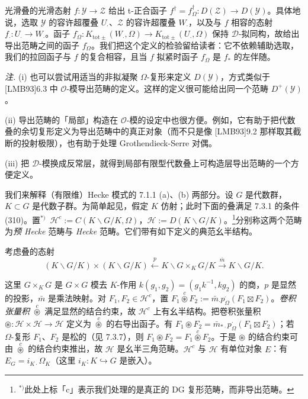 光滑叠的光滑态射 $f:\mathcal{Y}\to\mathcal{Z}$ 给出 t-正合函子 $f^{\dagger}=f^{\dagger}_{\Omega}:D(\mathcal{Z})\to D(\mathcal{Y})$。具体地说，选取 $\mathcal{Y}$ 的容许超覆叠 $U_{\cdot}$、$\mathcal{Z}$ 的容许超覆叠 $W_{\cdot}$，以及与 $f$ 相容的态射 $f_{\cdot}:U_{\cdot}\to W_{\cdot}$。函子 $f^{\cdot}_{\Omega}:K_{\mathrm{tot}\pm}(W_{\cdot},\Omega)\to K_{\mathrm{tot}\pm}(U_{\cdot},\Omega)$ 保持 $\mathcal{D}$-拟同构，故给出导出范畴之间的函子 $f^{\cdot}_{\Omega}$。我们把这个定义的检验留给读者：它不依赖辅助选取，我们的拉回函子与 $f$ 的复合相容，且当 $f$ 拟紧时函子 $f^{\cdot}_{\Omega}$ 是 $f_{*}$ 的左伴随。



 \emph{注.} (i) 也可以尝试用适当的非拟凝聚 $\Omega$-复形来定义 $D(\mathcal{Y})$，方式类似于 [LMB93]6.3 中 $\mathcal{O}$-模导出范畴的定义。这样的定义很可能给出同一个范畴 $D^{+}(\mathcal{Y})$。

(ii) 导出范畴的「局部」构造在 $\mathcal{O}$-模的设定中也很方便。例如，它有助于把代数叠的余切复形定义为导出范畴中的真正对象（而不只是像 [LMB93]9.2 那样取其截断的投射极限），也有助于处理 Grothendieck-Serre 对偶。

(iii) 把 $\mathcal{D}$-模换成反常层，就得到局部有限型代数叠上可构造层导出范畴的一个方便定义。


 我们来解释（有限维）Hecke 模式的 7.1.1 (a)、(b) 两部分。设 $G$ 是代数群，$K\subset G$ 是代数子群。为简单起见，假定 $K$ 仿射；此时下面的叠满足 7.3.1 的条件 (310)。置$^{*)}$\ $\mathcal{H}^{c}:=C(K\backslash G/K,\Omega)$，$\mathcal{H}:=D(K\backslash G/K)$。\footnote{$^{*)}$此处上标「c」表示我们处理的是真正的 DG 复形范畴，而非导出范畴。}分别称这两个范畴为\emph{预 Hecke} 范畴与 \emph{Hecke} 范畴。它们带有如下定义的典范幺半结构。

考虑叠的态射
\begin{equation}\tag{318}
(K\backslash G/K)\times(K\backslash G/K)\xleftarrow{p}K\backslash G\times_{K}G/K\xrightarrow{\bar m}K\backslash G/K.
\end{equation}


这里 $G\times_{K}G$ 是 $G\times G$ 模去 $K$-作用 $k(g_{1},g_{2})=(g_{1}k^{-1},kg_{2})$ 的商，$p$ 是显然的投影，$\bar m$ 是乘法映射。对 $F_{1},F_{2}\in\mathcal{H}^{c}$，置 $F_{1}\overset{c}{\circledast}F_{2}:=\bar m_{\cdot}p^{\cdot}_{\Omega}(F_{1}\boxtimes F_{2})$。\emph{卷积张量积} $\overset{c}{\circledast}$ 满足显然的结合约束，故 $\mathcal{H}^{c}$ 上有幺半结构。把卷积张量积 $\circledast:\mathcal{H}\times\mathcal{H}\longrightarrow\mathcal{H}$ 定义为 $\overset{c}{\circledast}$ 的右导出函子。有 $F_{1}\circledast F_{2}=\bar m_{*\cdot}p^{\cdot}_{\Omega}(F_{1}\boxtimes F_{2})$；若 $\Omega$-复形 $F_{1}$、$F_{2}$ 是松的（见 7.3.7），则 $F_{1}\circledast F_{2}=F_{1}\overset{c}{\circledast}F_{2}$。于是 $\circledast$ 的结合约束可由 $\overset{c}{\circledast}$ 的结合约束推出，故 $\mathcal{H}$ 是幺半三角范畴。$\mathcal{H}^{c}$ 与 $\mathcal{H}$ 有单位对象 $E$：有 $E_{G}=i_{K\cdot}\Omega_{K}$（这里 $i_{K}:K\hookrightarrow G$ 是嵌入）。

